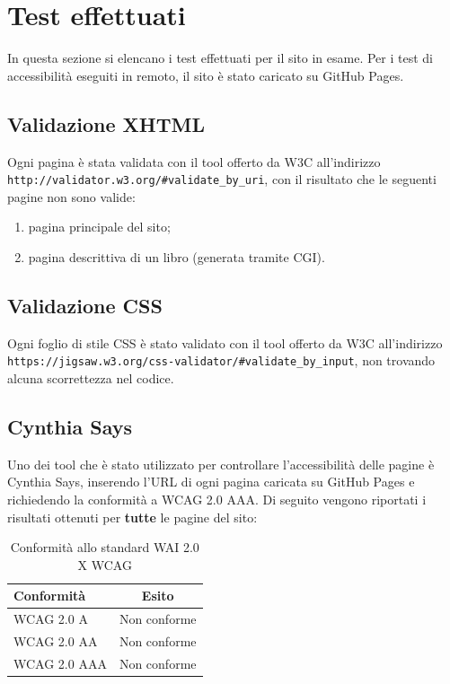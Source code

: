 \section{Test effettuati} %
In questa sezione si elencano i test effettuati per il sito in esame.
Per i test di accessibilità eseguiti in remoto, il sito è stato caricato su
GitHub Pages.

\subsection{Validazione XHTML} %
Ogni pagina è stata validata con il tool offerto da W3C all'indirizzo
\texttt{http://validator.w3.org/\#validate\_by\_uri}, con il risultato che
le seguenti pagine non sono valide:
\begin{enumerate}
\item pagina principale del sito;
\item pagina descrittiva di un libro (generata tramite CGI).
\end{enumerate}

\subsection{Validazione CSS} %
Ogni foglio di stile CSS è stato validato con il tool offerto da W3C
all'indirizzo
\texttt{https://jigsaw.w3.org/css-validator/\#validate\_by\_input}, non
trovando alcuna scorrettezza nel codice.

\subsection{Cynthia Says} %
Uno dei tool che è stato utilizzato per controllare l'accessibilità delle
pagine è Cynthia Says, inserendo l'URL di ogni pagina caricata su GitHub Pages
e richiedendo la conformità a WCAG 2.0 AAA.
Di seguito vengono riportati i risultati ottenuti per \textbf{tutte} le pagine
del sito:

\begin{table}[h!]
\begin{center}
\begin{tabular}{ | l | c | }
  \hline
  Conformità & Esito \\
  \hline
  WCAG 2.0 A & Non conforme \\
  \hline
  WCAG 2.0 AA & Non conforme \\
  \hline
  WCAG 2.0 AAA & Non conforme \\
  \hline
\end{tabular}
\caption{Conformità allo standard WAI 2.0 X WCAG}
\end{center}
\end{table}

